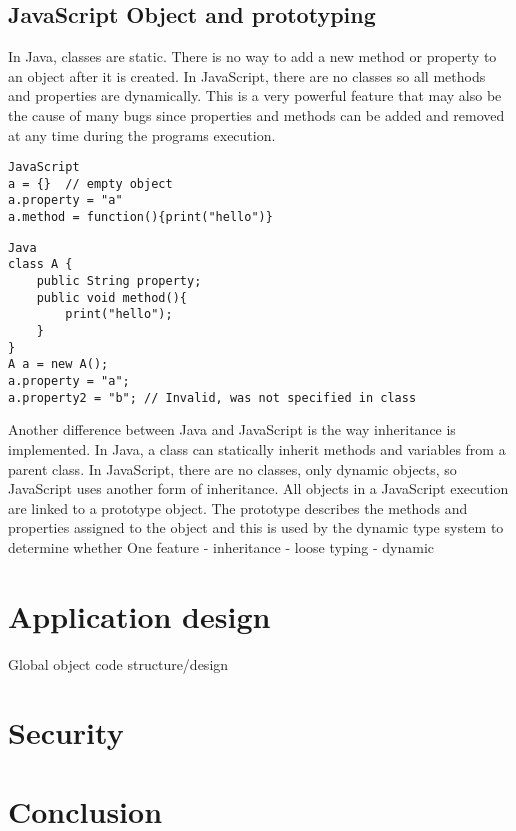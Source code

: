 \documentclass{report}
\begin{document}
	\subsection{JavaScript Object and prototyping}
	In Java, classes are static. There is no way to add a new method or property to an object after it is created. In JavaScript, there are no classes so all methods and properties are dynamically. This is a very powerful feature that may also be the cause of many bugs since properties and methods can be added and removed at any time during the programs execution.
\begin{verbatim}
JavaScript
a = {} 	// empty object
a.property = "a"
a.method = function(){print("hello")}
\end{verbatim}

\begin{verbatim}
Java
class A {
	public String property;
	public void method(){
		print("hello");
	}
}
A a = new A();
a.property = "a";
a.property2 = "b"; // Invalid, was not specified in class
\end{verbatim}
Another difference between Java and JavaScript is the way inheritance is implemented. In Java, a class can statically inherit methods and variables from a parent class. In JavaScript, there are no classes, only dynamic objects, so JavaScript uses another form of inheritance. All objects in a JavaScript execution are linked to a prototype object. The prototype describes the methods and properties assigned to the object and this is used by the dynamic type system to determine whether 
	One feature
	- inheritance
	- loose typing
	- dynamic
\section{Application design}
	Global object
	code structure/design

\section{Security}

\section{Conclusion}
\end{document}
